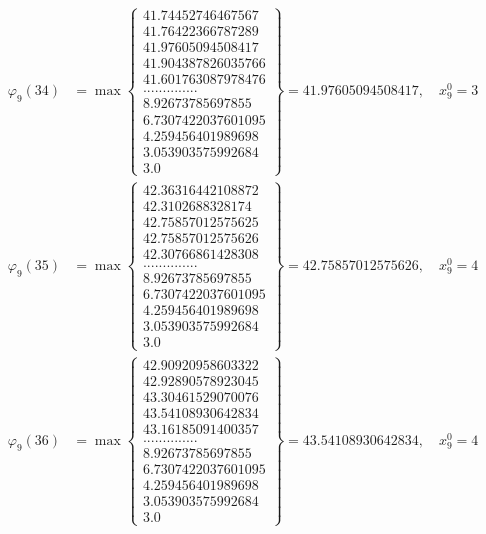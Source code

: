 \documentclass{article}
\begin{document}
\begin{align*}
  
  
  
\varphi_{9}(34) &= \max \left\{ \begin{array}{c}
41.74452746467567 \\
 41.76422366787289 \\
 41.97605094508417 \\
 41.904387826035766 \\
 41.601763087978476 \\
 .............. \\
 8.92673785697855 \\
 6.7307422037601095 \\
 4.259456401989698 \\
 3.053903575992684 \\
 3.0
\end{array} \right\} = 41.97605094508417, \quad x_{9}^0 = 3\\
  
  
  
  
\varphi_{9}(35) &= \max \left\{ \begin{array}{c}
42.36316442108872 \\
 42.3102688328174 \\
 42.75857012575625 \\
 42.75857012575626 \\
 42.30766861428308 \\
 .............. \\
 8.92673785697855 \\
 6.7307422037601095 \\
 4.259456401989698 \\
 3.053903575992684 \\
 3.0
\end{array} \right\} = 42.75857012575626, \quad x_{9}^0 = 4\\
  
  
  
  
\varphi_{9}(36) &= \max \left\{ \begin{array}{c}
42.90920958603322 \\
 42.92890578923045 \\
 43.30461529070076 \\
 43.54108930642834 \\
 43.16185091400357 \\
 .............. \\
 8.92673785697855 \\
 6.7307422037601095 \\
 4.259456401989698 \\
 3.053903575992684 \\
 3.0
\end{array} \right\} = 43.54108930642834, \quad x_{9}^0 = 4\\
  
  
\end{align*}
\end{document}

